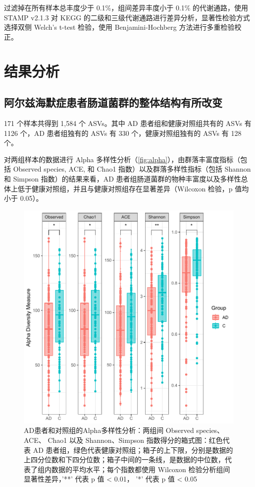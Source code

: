 \documentclass[supercite]{HustGraduPaper}
\begin{document}
过滤掉在所有样本总丰度少于 0.1\%，组间差异丰度小于 0.1\% 的代谢通路，使用 STAMP\cite{parks2014stamp} v2.1.3 对 KEGG 的二级和三级代谢通路进行差异分析，显著性检验方式选择双侧 Welch's t-test 检验，使用 Benjamini-Hochberg 方法进行多重检验校正。


\section{结果分析}
\subsection{阿尔兹海默症患者肠道菌群的整体结构有所改变}
171 个样本共得到 1,584 个 ASVs。其中 AD 患者组和健康对照组共有的 ASVs 有 1126 个，AD 患者组独有的 ASVs 有 330 个，健康对照组独有的 ASVs 有 128 个。

对两组样本的数据进行 Alpha 多样性分析（\autoref{fig:alpha}），由群落丰富度指标（包括 Observed species, ACE, 和 Chao1 指数）以及群落多样性指标（包括 Shannon 和 Simpson 指数）的结果来看，AD 患者组肠道菌群的物种丰富度以及多样性总体上低于健康对照组，并且与健康对照组存在显著差异（Wilcoxon 检验，p 值均小于 0.05）。

\begin{figure}[htb]
	\centering
	\includegraphics[scale=0.6]{plot/alpha.pdf}
	\caption{AD患者和对照组的Alpha多样性分析：两组间 Observed species、 ACE、 Chao1 以及 Shannon、Simpson 指数得分的箱式图：红色代表 AD 患者组，绿色代表健康对照组；箱子的上下限，分别是数据的上四分位数和下四分位数；箱子中间的一条线，是数据的中位数，代表了组内数据的平均水平；每个指数都使用 Wilcoxon 检验分析组间显著性差异，'**' 代表 p 值 < 0.01， '*' 代表 p 值 < 0.05 }
	\label{fig:alpha}
\end{figure}
\end{document}
